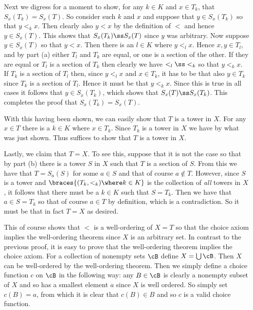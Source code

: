 {{    Next we digress for a moment to show, for any $k \in K$ and $x \in T_k$, that $S_x(T_k) = S_x(T)$.
    So consider such $k$ and $x$ and suppose that $y \in S_x(T_k)$ so that $y <_k x$.
    Then clearly also $y < x$ by the definition of $<$ and hence $y \in S_x(T)$.
    This shows that $S_x(T_k) \ss S_x(T)$ since $y$ was arbitrary.
    Now suppose $y \in S_x(T)$ so that $y < x$.
    Then there is an $l \in K$ where $y <_l x$.
    Hence $x,y \in T_l$, and by part (a) either $T_l$ and $T_k$ are equal, or one is a section of the other.
    If they are equal or $T_l$ is a section of $T_k$ then clearly we have $<_l \ss <_k$ so that $y <_k x$.
    If $T_k$ is a section of $T_l$ then, since $y <_l x$ and $x \in T_k$, it has to be that also $y \in T_k$ since $T_k$ is a section of $T_l$.
    Hence it must be that $y <_k x$.
    Since this is true in all cases it follows that $y \in S_x(T_k)$, which shows that $S_x(T) \ss S_x(T_k)$.
    This completes the proof that $S_x(T_k) = S_x(T)$.

    With this having been shown, we can easily show that $T$ is a tower in $X$.
    For any $x \in T$ there is a $k \in K$ where $x \in T_k$.
    Since $T_k$ is a tower in $X$ we have
    by what was just shown.
    Thus suffices to show that $T$ is a tower in $X$.

    Lastly, we claim that $T = X$.
    To see this, suppose that it is not the case so that by part (b) there is a tower $S$ in $X$ such that $T$ is a section of $S$.
    From this we have that $T = S_a(S)$ for some $a \in S$ and that of course $a \notin T$.
    However, since $S$ is a tower and $\braces{(T_k,<_k) \where k \in K}$ is the collection of \emph{all} towers in $X$, it follows that there must be a $k \in K$ such that $S = T_k$.
    Then we have that $a \in S = T_k$ so that of course $a \in T$ by definition, which is a contradiction.
    So it must be that in fact $T = X$ as desired.

    This of course shows that $<$ is a well-ordering of $X = T$ so that the choice axiom implies the well-ordering theorem since $X$ is an arbitrary set.
    In contrast to the previous proof, it is easy to prove that the well-ordering theorem implies the choice axiom.
    For a collection of nonempty sets $\cB$ define $X = \bigcup \cB$.
    Then $X$ can be well-ordered by the well-ordering theorem.
    Then we simply define a choice function $c$ on $\cB$ in the following way: any $B \in \cB$ is clearly a nonempty subset of $X$ and so has a smallest element $a$ since $X$ is well ordered.
    So simply set $c(B) = a$, from which it is clear that $c(B) \in B$ and so $c$ is a valid choice function.
  }
}

